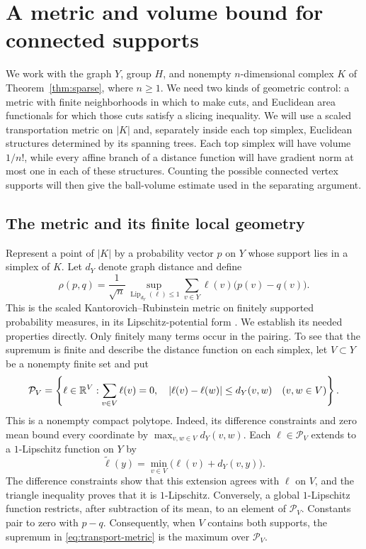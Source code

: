 \section{A metric and volume bound for connected supports}
\label{sec:metric}

We work with the graph \(Y\), group \(H\), and nonempty
\(n\)-dimensional complex \(K\) of Theorem~\ref{thm:sparse}, where
\(n\geq1\).  We need two kinds of geometric control: a metric with
finite neighborhoods in which to make cuts, and Euclidean area
functionals for which those cuts satisfy a slicing inequality.
We will use a scaled transportation metric on \(|K|\) and,
separately inside each top simplex, Euclidean structures determined
by its spanning trees.  Each top simplex will have volume \(1/n!\),
while every affine branch of a distance function will have gradient
norm at most one in each of these structures.  Counting the possible
connected vertex supports will then give the ball-volume estimate
used in the separating argument.

\subsection{The metric and its finite local geometry}

Represent a point of \(|K|\) by a probability vector \(p\) on \(Y\) whose
support lies in a simplex of \(K\).  Let \(d_Y\) denote graph distance and
define
\begin{equation}
 \rho(p,q)=\frac1{\sqrt n}
 \sup_{\operatorname{Lip}_{d_Y}(\ell)\leq1}
 \sum_{v\in Y}\ell(v)\bigl(p(v)-q(v)\bigr).
 \label{eq:transport-metric}
\end{equation}
This is the scaled Kantorovich--Rubinstein metric on finitely
supported probability measures, in its Lipschitz-potential form
\cite[pp.~1381--1382]{Kantorovich2006}. We establish its needed
properties directly.
Only finitely many terms occur in the pairing.  To see that the
supremum is finite and describe the distance function on each simplex,
let \(V\subset Y\) be a nonempty finite set and put
\[
 \mathcal P_V=
 \left\{\ell\in\mathbb R^V:
   \sum_{v\in V}\ell(v)=0,\quad
   |\ell(v)-\ell(w)|\leq d_Y(v,w)\quad(v,w\in V)\right\}.
\]
This is a nonempty compact polytope.  Indeed, its difference constraints
and zero mean bound every coordinate by
\(\max_{v,w\in V}d_Y(v,w)\).  Each \(\ell\in\mathcal P_V\) extends to
a \(1\)-Lipschitz function on \(Y\) by
\[
 \widetilde\ell(y)=\min_{v\in V}\bigl(\ell(v)+d_Y(v,y)\bigr).
\]
The difference constraints show that this extension agrees with
\(\ell\) on \(V\), and the triangle inequality proves that it is
\(1\)-Lipschitz.  Conversely, a global \(1\)-Lipschitz function restricts,
after subtraction of its mean, to an element of \(\mathcal P_V\).
Constants pair to zero with \(p-q\).  Consequently, when \(V\) contains
both supports, the supremum in \eqref{eq:transport-metric} is the maximum
over \(\mathcal P_V\).


